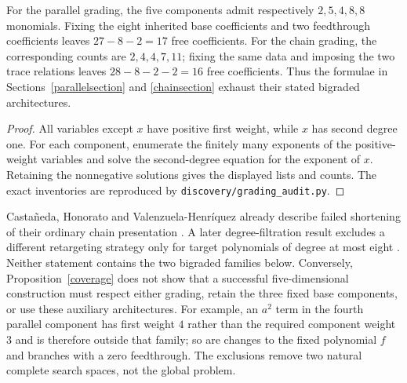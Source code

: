 \documentclass[11pt,a4paper]{article}
\theoremstyle{remark}\newtheorem{remark}[theorem]{Remark}
\begin{document}
\begin{proposition}\label{coverage}
For the parallel grading, the five components admit respectively
$2,5,4,8,8$ monomials.  Fixing the eight inherited base coefficients and two
feedthrough coefficients leaves $27-8-2=17$ free coefficients.  For the chain
grading, the corresponding counts are $2,4,4,7,11$; fixing the same data and
imposing the two trace relations leaves $28-8-2-2=16$ free coefficients.
Thus the formulae in Sections~\ref{parallelsection} and \ref{chainsection}
exhaust their stated bigraded architectures.
\end{proposition}
\begin{proof}
All variables except $x$ have positive first weight, while $x$ has second
degree one.  For each component, enumerate the finitely many exponents of the
positive-weight variables and solve the second-degree equation for the exponent
of $x$.  Retaining the nonnegative solutions gives the displayed lists and
counts.  The exact inventories are reproduced by
\texttt{discovery/grading\_audit.py}.
\end{proof}

Casta\~neda, Honorato and Valenzuela-Henr\'iquez already describe failed
shortening of their ordinary chain presentation \cite{chain}.  A later
degree-filtration result excludes a different retargeting strategy only for
target polynomials of degree at most eight \cite{ksl}.  Neither statement
contains the two bigraded families below.  Conversely, Proposition~\ref{coverage}
does not show that a successful five-dimensional construction must respect either
grading, retain the three fixed base components, or use these auxiliary
architectures.  For example, an $a^2$ term in the fourth parallel component has
first weight $4$ rather than the required component weight $3$ and is therefore
outside that family; so are changes to the fixed polynomial $f$ and branches
with a zero feedthrough.  The exclusions remove two natural complete search
spaces, not the global problem.
\end{document}
